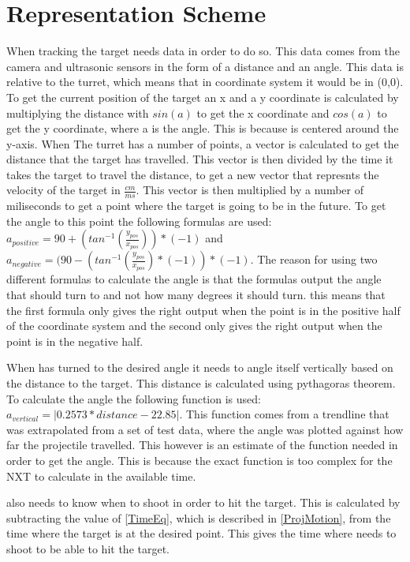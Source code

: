 \chapter{Representation Scheme}
When tracking the target \name needs data in order to do so. This data comes
from the camera and ultrasonic sensors in the form of a distance and an angle.
This data is relative to the turret, which means that in coordinate system it
would be in (0,0). To get the current position of the target an x and a y
coordinate is calculated by multiplying the distance with $sin(a)$ to get the x coordinate and
$cos(a)$ to get the y coordinate, where a is the angle. This is because \name is
centered around the y-axis. When The turret has a number of points, a vector is
calculated to get the distance that the target has travelled. This vector is
then divided by the time it takes the target to travel the distance, to get a new vector that represnts the
velocity of the target in $\frac{cm}{ms}$. This vector is then multiplied by a
number of miliseconds to get a point where the target is going to be in the
future. To get the angle to this point the following formulas are used:
$a_{positive}=90+(tan^{-1}(\frac{y_{pos}}{x_{pos}}))*(-1)$ and
$a_{negative}=(90-(tan^{-1}(\frac{y_{pos}}{x_{pos}})*(-1))*(-1)$. The reason for
using two different formulas to calculate the angle is that the formulas output
the angle that \name should turn to and not how many degrees it should turn.
this means that the first formula only gives the right output when the point is
in the positive half of the coordinate system and the second only gives the
right output when the point is in the negative half.\nl


When \name has turned to the desired angle it needs to angle itself vertically
based on the distance to the target. This distance is calculated using
pythagoras theorem. To calculate the angle the following function is used:\\
$a_{vertical}=| 0.2573*distance-22.85 |$.
This function comes from a trendline that was extrapolated from a set of test
data, where the angle was plotted against how far the projectile travelled. This
however is an estimate of the function needed in order to get the
angle. This is because the exact function is too complex for the NXT to
calculate in the available time.\nl
 
\name also needs to know when to shoot in order to hit the target.
This is calculated by subtracting the value of \autoref{TimeEq}, which is described in
\autoref{ProjMotion}, from the time where the target is at the desired point.
This gives the time where \name needs to shoot to be able to hit the target.
